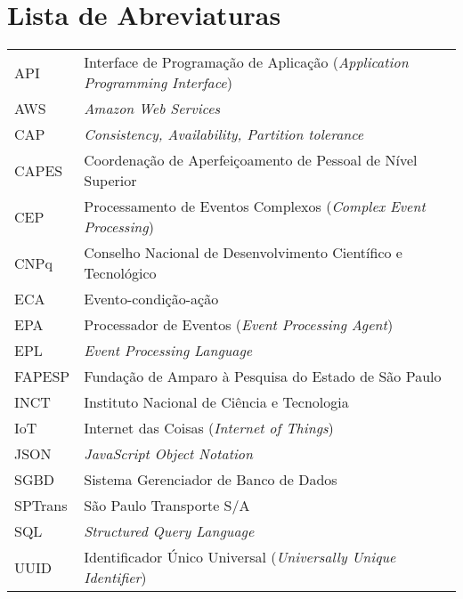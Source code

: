 \documentclass[11pt,twoside,a4paper]{book}
\begin{document}
\tableofcontents    %

\chapter{Lista de Abreviaturas}
\begin{tabular}{ll}
         API		 & Interface de Programação de Aplicação (\emph{Application Programming Interface}) \\
         AWS         & \textit{Amazon Web Services} \\
         CAP         & \textit{Consistency, Availability, Partition tolerance}\\
         CAPES       & Coordenação de Aperfeiçoamento de Pessoal de Nível Superior\\
         CEP         & Processamento de Eventos Complexos (\emph{Complex Event Processing})\\
         CNPq        & Conselho Nacional de Desenvolvimento Científico e Tecnológico\\
         ECA         & Evento-condição-ação\\
         EPA         & Processador de Eventos (\emph{Event Processing Agent})\\
         EPL         & \textit{Event Processing Language}\\
         FAPESP      & Fundação de Amparo à Pesquisa do Estado de São Paulo\\
         INCT        & Instituto Nacional de Ciência e Tecnologia\\ 
         IoT         & Internet das Coisas (\emph{Internet of Things})\\
         JSON        & \textit{JavaScript Object Notation} \\
         SGBD        & Sistema Gerenciador de Banco de Dados \\
         SPTrans   & São Paulo Transporte S/A \\
         SQL         & \textit{Structured Query Language}\\
         UUID        & Identificador Único Universal (\emph{Universally Unique Identifier})
         
\end{tabular}

\end{document}
